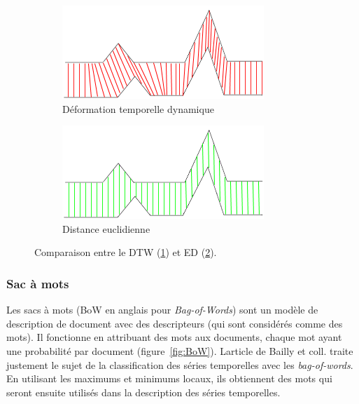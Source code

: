\documentclass[11pt,final,ENIB]{sdm}
\begin{document}
			\begin{figure}[!ht]
				\begin{subfigure}{0.45\textwidth}
					\centering	
					\includegraphics[scale= 0.6,natwidth=288,natheight=133]{figures/dtw.png}
					\caption{D\'eformation temporelle dynamique}
					\label{fig:dtw}
				\end{subfigure}
				\hspace*{\fill}
				\begin{subfigure}{0.45\textwidth}	
					\centering
					\includegraphics[scale= 0.6,natwidth=288,natheight=133]{figures/ed.png}
					\caption{Distance euclidienne}
					\label{fig:ed}
				\end{subfigure}
				\caption{Comparaison entre le DTW (\ref{fig:dtw}) et ED (\ref{fig:ed}).}
				\label{fig:distance}
			\end{figure}



		\subsubsection{Sac \`a mots}
		\label{seq:bagOfWords}
			Les sacs \`a mots (BoW en anglais pour \textit{Bag-of-Words}) sont un mod\`ele de description de document avec des descripteurs (qui sont consid\'er\'es comme des mots). Il fonctionne en attribuant des mots aux documents, chaque mot ayant une probabilit\'e par document (figure~\ref{fig:BoW}). L\textquotesingle article de Bailly et coll. \cite{bailly2015bag} traite justement le sujet de la classification des s\'eries temporelles avec les \textit{bag-of-words}. En utilisant les maximums et minimums locaux, ils obtiennent des mots qui seront ensuite utilis\'es dans la description des s\'eries temporelles.
\end{document}
